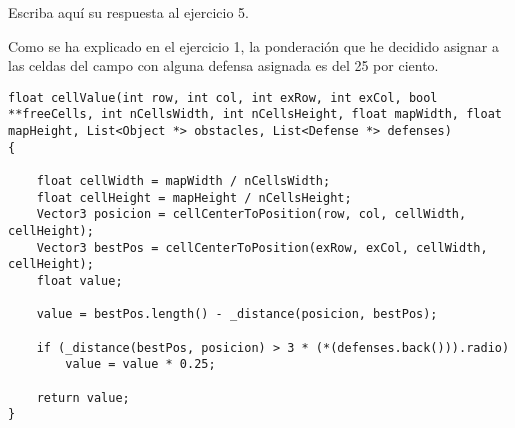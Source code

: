 Escriba aquí su respuesta al ejercicio 5.

Como se ha explicado en el ejercicio 1, la ponderación que he decidido asignar a las celdas del campo con alguna
defensa asignada es del 25 por ciento.

\begin{lstlisting}
float cellValue(int row, int col, int exRow, int exCol, bool **freeCells, int nCellsWidth, int nCellsHeight, float mapWidth, float mapHeight, List<Object *> obstacles, List<Defense *> defenses)
{

    float cellWidth = mapWidth / nCellsWidth;
    float cellHeight = mapHeight / nCellsHeight;
    Vector3 posicion = cellCenterToPosition(row, col, cellWidth, cellHeight);
    Vector3 bestPos = cellCenterToPosition(exRow, exCol, cellWidth, cellHeight);
    float value;

    value = bestPos.length() - _distance(posicion, bestPos);

    if (_distance(bestPos, posicion) > 3 * (*(defenses.back())).radio)
        value = value * 0.25;

    return value;
}
\end{lstlisting}